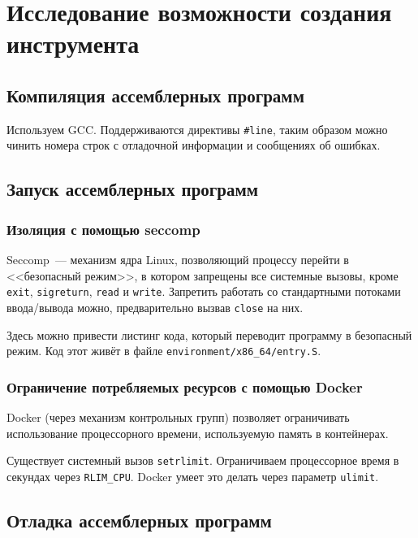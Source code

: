 \documentclass[a4paper,article,14pt]{extarticle}
\begin{document}
\section{Исследование возможности создания инструмента}

\subsection{Компиляция ассемблерных программ}

Используем GCC. Поддерживаются директивы \texttt{\#line}, таким образом можно чинить номера строк с отладочной информации и сообщениях об ошибках.

\subsection{Запуск ассемблерных программ}

\subsubsection{Изоляция с помощью seccomp}

Seccomp~--- механизм ядра Linux, позволяющий процессу перейти в <<безопасный режим>>, в котором запрещены все системные вызовы, кроме \texttt{exit}, \texttt{sigreturn}, \texttt{read} и \texttt{write}. Запретить работать со стандартными потоками ввода/вывода можно, предварительно вызвав \texttt{close} на них.

Здесь можно привести листинг кода, который переводит программу в безопасный режим. Код этот живёт в файле \texttt{environment/x86\_64/entry.S}.

\subsubsection{Ограничение потребляемых ресурсов с помощью Docker}

Docker (через механизм контрольных групп) позволяет ограничивать использование процессорного времени, используемую память в контейнерах.

Существует системный вызов \texttt{setrlimit}. Ограничиваем процессорное время в секундах через \texttt{RLIM\_CPU}. Docker умеет это делать через параметр \texttt{ulimit}.

\subsection{Отладка ассемблерных программ}
\end{document}
